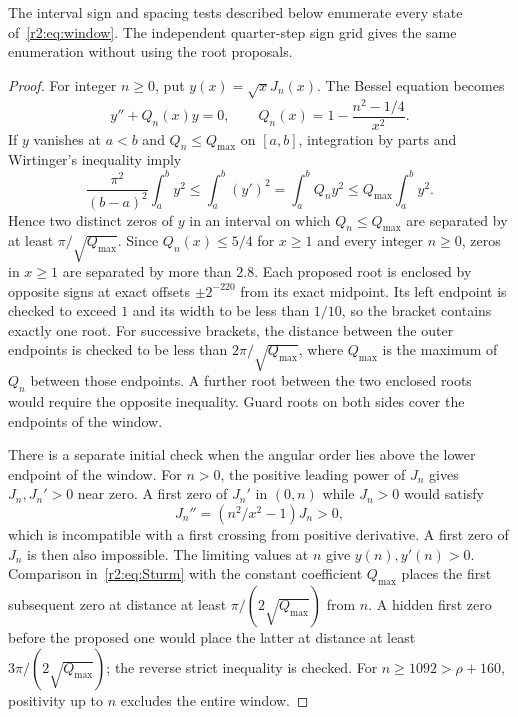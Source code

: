 \begin{lemma}\label{r2:lem:zero-coverage}
The interval sign and spacing tests described below enumerate every state of~\eqref{r2:eq:window}. The independent quarter-step sign grid gives the same enumeration without using the root proposals.
\end{lemma}
\begin{proof}
For integer $n\ge0$, put $y(x)=\sqrt{x}J_n(x)$. The Bessel equation becomes
\begin{equation}\label{r2:eq:Sturm}
 y''+Q_n(x)y=0,\qquad Q_n(x)=1-\frac{n^2-1/4}{x^2}.
\end{equation}
If $y$ vanishes at $a<b$ and $Q_n\le Q_{\max}$ on $[a,b]$, integration by parts and Wirtinger's inequality imply
\[
 \frac{\pi^2}{(b-a)^2}\int_a^b y^2
 \le\int_a^b(y')^2=\int_a^bQ_ny^2
 \le Q_{\max}\int_a^b y^2.
\]
Hence two distinct zeros of $y$ in an interval on which $Q_n\le Q_{\max}$ are separated by at least $\pi/\sqrt{Q_{\max}}$. Since $Q_n(x)\le5/4$ for $x\ge1$ and every integer $n\ge0$, zeros in $x\ge1$ are separated by more than $2.8$. Each proposed root is enclosed by opposite signs at exact offsets $\pm2^{-220}$ from its exact midpoint. Its left endpoint is checked to exceed $1$ and its width to be less than $1/10$, so the bracket contains exactly one root. For successive brackets, the distance between the outer endpoints is checked to be less than $2\pi/\sqrt{Q_{\max}}$, where $Q_{\max}$ is the maximum of $Q_n$ between those endpoints. A further root between the two enclosed roots would require the opposite inequality. Guard roots on both sides cover the endpoints of the window.

There is a separate initial check when the angular order lies above the lower endpoint of the window. For $n>0$, the positive leading power of $J_n$ gives $J_n,J_n'>0$ near zero. A first zero of $J_n'$ in $(0,n)$ while $J_n>0$ would satisfy
\[
 J_n''=(n^2/x^2-1)J_n>0,
\]
which is incompatible with a first crossing from positive derivative. A first zero of $J_n$ is then also impossible. The limiting values at $n$ give $y(n),y'(n)>0$. Comparison in~\eqref{r2:eq:Sturm} with the constant coefficient $Q_{\max}$ places the first subsequent zero at distance at least $\pi/(2\sqrt{Q_{\max}})$ from $n$. A hidden first zero before the proposed one would place the latter at distance at least $3\pi/(2\sqrt{Q_{\max}})$; the reverse strict inequality is checked. For $n\ge1092>\rho+160$, positivity up to $n$ excludes the entire window.


\end{proof}
